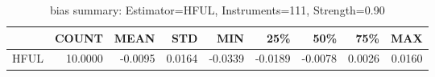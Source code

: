 \begin{table}[ht]
\centering
\caption{bias summary: Estimator=HFUL, Instruments=111, Strength=0.90}
\begin{tabular}{lrrrrrrrr}
\toprule
 & COUNT & MEAN & STD & MIN & 25\% & 50\% & 75\% & MAX \\
\midrule
HFUL & 10.0000 & -0.0095 & 0.0164 & -0.0339 & -0.0189 & -0.0078 & 0.0026 & 0.0160 \\
\bottomrule
\end{tabular}
\end{table}
